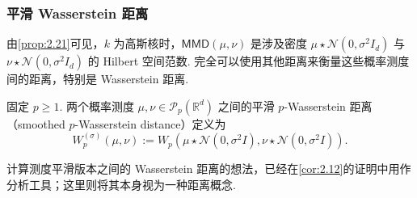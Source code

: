\subsubsection{平滑 Wasserstein 距离}\label{sec:2.8.3}
由\autoref{prop:2.21}可见，$k$ 为高斯核时，$\mathsf{MMD}(\mu,\nu)$ 是涉及密度 $\mu\star\mathcal N(0,\sigma^2I_d)$ 与 $\nu\star\mathcal N(0,\sigma^2I_d)$ 的 Hilbert 空间范数. 完全可以使用其他距离来衡量这些概率测度间的距离，特别是 Wasserstein 距离.
\begin{definition}\label{def:2.23}
固定 $p\ge1$. 两个概率测度 $\mu,\nu\in\mathcal P_p(\mathbb R^d)$ 之间的平滑 $p$-Wasserstein 距离（smoothed $p$-Wasserstein distance）定义为
$$W_p^{(\sigma)}(\mu,\nu):=W_p(\mu\star\mathcal N(0,\sigma^2I),\nu\star\mathcal N(0,\sigma^2I)).$$
\end{definition}
计算测度平滑版本之间的 Wasserstein 距离的想法，已经在\autoref{cor:2.12}的证明中用作分析工具；这里则将其本身视为一种距离概念.

